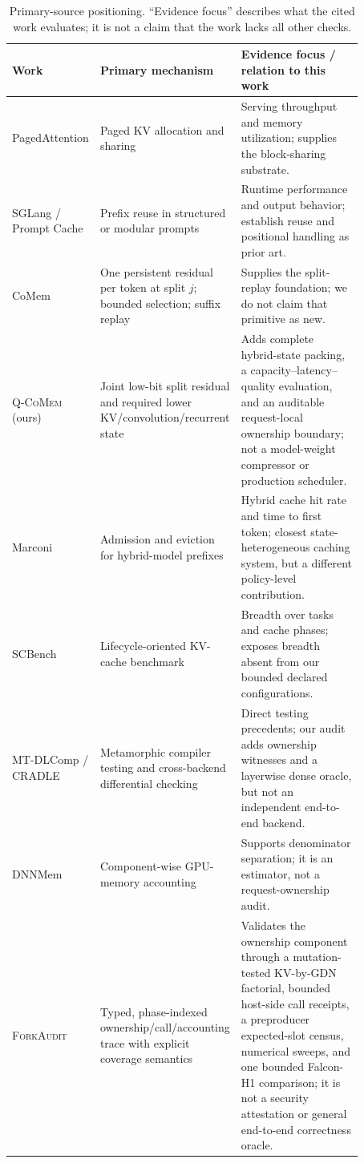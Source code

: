 \documentclass{article}
\newcommand{\qcomem}{\textsc{Q-CoMem}}
\newcommand{\method}{\textsc{ForkAudit}}
\begin{document}
\begin{table}[H]
  \caption{Primary-source positioning.  ``Evidence focus'' describes what the
  cited work evaluates; it is not a claim that the work lacks all other checks.}
  \label{tab:closest}
  \centering
  \footnotesize
  \begin{tabular}{@{}p{0.16\linewidth}p{0.28\linewidth}p{0.43\linewidth}@{}}
    \toprule
    Work & Primary mechanism & Evidence focus / relation to this work \\
    \midrule
    PagedAttention & Paged KV allocation and sharing~\citep{kwon2023pagedattention} & Serving throughput and memory utilization; supplies the block-sharing substrate. \\
    SGLang / Prompt Cache & Prefix reuse in structured or modular prompts~\citep{zheng2024sglang,gim2024promptcache} & Runtime performance and output behavior; establish reuse and positional handling as prior art. \\
    CoMem & One persistent residual per token at split $j$; bounded selection; suffix replay~\citep{liu2026comem,liu2026understanding} & Supplies the split-replay foundation; we do not claim that primitive as new. \\
    \qcomem{} (ours) & Joint low-bit split residual and required lower KV/convolution/recurrent state & Adds complete hybrid-state packing, a capacity--latency--quality evaluation, and an auditable request-local ownership boundary; not a model-weight compressor or production scheduler. \\
    Marconi & Admission and eviction for hybrid-model prefixes~\citep{pan2025marconi} & Hybrid cache hit rate and time to first token; closest state-heterogeneous caching system, but a different policy-level contribution. \\
    SCBench & Lifecycle-oriented KV-cache benchmark~\citep{li2025scbench} & Breadth over tasks and cache phases; exposes breadth absent from our bounded declared configurations. \\
    MT-DLComp / CRADLE & Metamorphic compiler testing and cross-backend differential checking~\citep{xiao2022metamorphic,pham2019cradle} & Direct testing precedents; our audit adds ownership witnesses and a layerwise dense oracle, but not an independent end-to-end backend. \\
    DNNMem & Component-wise GPU-memory accounting~\citep{gao2020dnnmem} & Supports denominator separation; it is an estimator, not a request-ownership audit. \\
    \method{} & Typed, phase-indexed ownership/call/accounting trace with explicit coverage semantics & Validates the ownership component through a mutation-tested KV-by-GDN factorial, bounded host-side call receipts, a preproducer expected-slot census, numerical sweeps, and one bounded Falcon-H1 comparison; it is not a security attestation or general end-to-end correctness oracle. \\
    \bottomrule
  \end{tabular}
\end{table}
\end{document}
